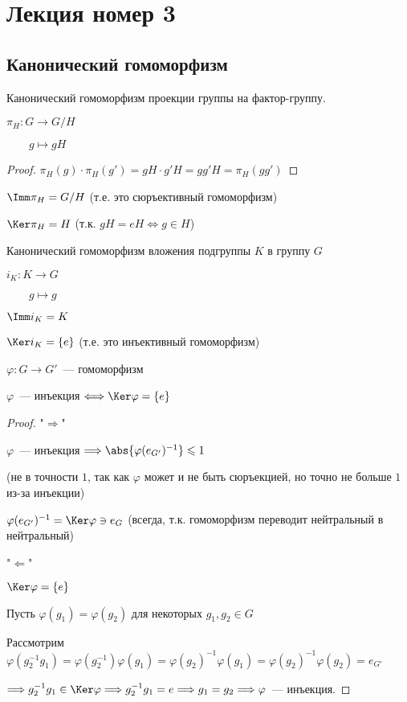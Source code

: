 \section{Лекция номер 3}

\subsection{Канонический гомоморфизм}

\begin{conj}
Канонический гомоморфизм проекции группы на фактор-группу.

$\pi_{H}: G \to G / H$

$\quad \quad g \mapsto gH$

\begin{proof}
    $\pi_{H}(g) \cdot \pi_{H}(g') = gH \cdot g'H = gg'H = \pi_{H}(gg')$
\end{proof}
$\Imm \pi_{H} = G / H$ (т.е. это сюръективный гомоморфизм)

$\Ker \pi_{H} = H$ (т.к. $gH = eH \Leftrightarrow g \in H$) 
\end{conj}

\begin{conj}
Канонический гомоморфизм вложения подгруппы $K$ в группу $G$

$i_{K}: K \to G$

$\quad \quad g \mapsto g$

$\Imm i_{K} = K$

$\Ker i_{K} = \{ e \}$ (т.е. это инъективный гомоморфизм)
\end{conj}

\notice 

$\varphi: G \to G'$~--- гомоморфизм

$\varphi$~--- инъекция $\Longleftrightarrow \Ker \varphi = \{ e \}$

\begin{proof}
    "$\Longrightarrow$"
    
    $\varphi$~--- инъекция $\Longrightarrow \abs{\varphi(e_{G'})^{-1}} \leqslant 1$
    
    (не в точности $1$, так как $\varphi$ может и не быть сюръекцией, но точно не больше $1$ из-за инъекции)

    $\varphi(e_{G'})^{-1} = \Ker \varphi \ni e_{G}$
    (всегда, т.к. гомоморфизм переводит нейтральный в нейтральный)

    "$\Longleftarrow$"

    $\Ker \varphi = \{ e \}$

    Пусть $\varphi(g_1) = \varphi(g_2)$ для некоторых $g_1, g_2 \in G$

    Рассмотрим $\varphi(g_2^{-1}g_1) = \varphi(g_2^{-1})\varphi(g_1) = \varphi(g_2)^{-1}\varphi(g_1) = \varphi(g_2)^{-1}\varphi(g_2) = e_{G'}$

    $\Longrightarrow g_2^{-1}g_1 \in \Ker \varphi \Longrightarrow g_2^{-1}g_1 = e \Longrightarrow g_1 = g_2 \Longrightarrow \varphi$~--- инъекция. 
\end{proof}

